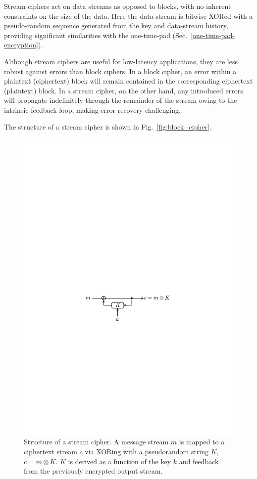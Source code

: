 Stream ciphers act on data streams as opposed to blocks, with no inherent constraints on the size of the data. Here the data-stream is bitwise XORed with a pseudo-random sequence generated from the key and data-stream history, providing significant similarities with the one-time-pad (Sec.~\ref{one-time-pad-encryption}).

Although stream ciphers are useful for low-latency applications, they are less robust against errors than block ciphers. In a block cipher, an error within a plaintext (ciphertext) block will remain contained in the corresponding ciphertext (plaintext) block. In a stream cipher, on the other hand, any introduced errors will propagate indefinitely through the remainder of the stream owing to the intrinsic feedback loop, making error recovery challenging.

The structure of a stream cipher is shown in Fig.~\ref{fig:block_cipher}.

\begin{figure}[!htb]
	\includegraphics[width=0.8\columnwidth]{figures/stream_cipher}
	\caption{Structure of a stream cipher. A message stream $m$ is mapped to a ciphertext stream $c$ via XORing with a pseudorandom string $K$, $c=m\otimes K$. $K$ is derived as a function of the key $k$ and feedback from the previously encrypted output stream.} \label{fig:stream_cipher}	
\end{figure}

